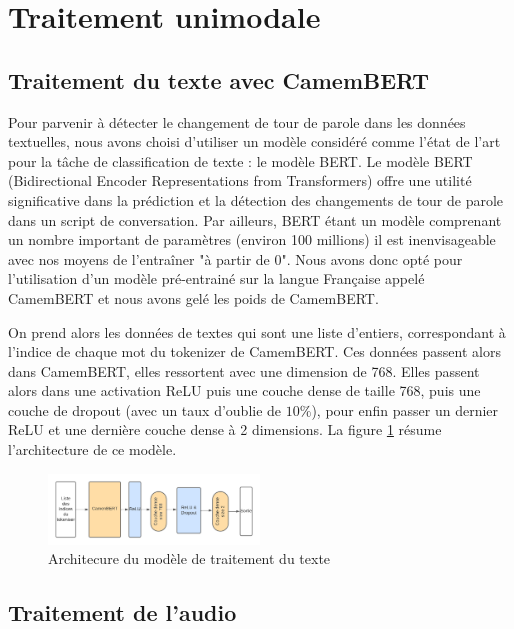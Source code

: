 \documentclass[a4paper]{article}
\begin{document}
\section{Traitement unimodale}

\subsection{Traitement du texte avec CamemBERT}

Pour parvenir à détecter le changement de tour de parole dans les données textuelles, nous avons choisi d'utiliser un modèle considéré comme l'état de l'art pour la tâche de classification de texte : le modèle BERT. Le modèle BERT (Bidirectional Encoder Representations from Transformers) offre une utilité significative dans la prédiction et la détection des changements de tour de parole dans un script de conversation.
Par ailleurs, BERT étant un modèle comprenant un nombre important de paramètres (environ 100 millions) il est inenvisageable avec nos moyens de l'entraîner "à partir de 0". Nous avons donc opté pour l'utilisation d'un modèle pré-entrainé sur la langue Française appelé CamemBERT et nous avons gelé les poids de CamemBERT.

On prend alors les données de textes qui sont une liste d'entiers, correspondant 
à l'indice de chaque mot du tokenizer de CamemBERT. Ces données passent alors dans CamemBERT, elles ressortent avec une dimension de 768. Elles passent alors dans une activation ReLU puis une couche dense de taille 768, puis une couche de dropout (avec un taux d'oublie de $10\%$), pour enfin passer un dernier ReLU et une dernière couche dense à 2 dimensions. 
La figure \ref{fig: model_text} résume l'architecture de ce modèle.

\begin{figure}[H]
    \centering
    \includegraphics[width=0.5\textwidth]{Traitement_texte_SAM.png}
    \caption{Architecure du modèle de traitement du texte}
    \label{fig: model_text}
\end{figure}

\subsection{Traitement de l'audio}
\end{document}
